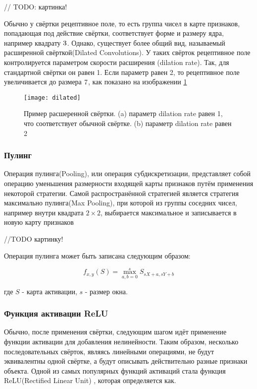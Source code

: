 // TODO: картинка!

Обычно у свёртки рецептивное поле, то есть группа чисел в карте признаков, попадающая под действие свёртки,
соответствует форме и размеру ядра, например квадрату $3 \time 3$. Однако, существует более общий вид,
называемый расширенной свёрткой(Dilated Convolutions)\cite{Dilated}. У таких свёрток рецептивное поле контролируется параметром скорости
расширения (dilation rate). Так, для стандартной свёртки он равен 1. Если параметр равен 2, то рецептивное поле увеличивается
до размера $7 \time 7$, как показано на изображении \ref{fig:dilated}

\begin{figure}[h]
    \centering
    \texttt{[image: dilated]}
    \caption{Пример расшеренной свёртки.     (a) параметр dilation rate равен 1, что соответствует обычной свёртке. (b) параметр dilation rate равен 2}
    \label{fig:dilated}
\end{figure}


\subsubsection{Пулинг}

Операция пулинга(Pooling), или операция субдискретизации, представляет собой операцию уменьшения размерности входящей карты признаков 
путём применения некоторой стратегии. Самой распространённой стратегией является стратегия максимально пулинга(Max Pooling),
при которой из группы соседних чисел, например внутри квадрата $2 \times 2$, выбирается максимальное и записывается в новую
карту признаков 

//TODO картинку!

Операция пулинга может быть записана следующим образом:

\begin{equation}
    f_{x,y}(S) = \max_{a,b=0}^{s}S_{sX+a, sY+b}
\end{equation}

где $S$ - карта активации, $s$ - размер окна.

\subsubsection{Функция активации ReLU}

Обычно, после применения свёртки, следующим шагом идёт применение функции активации для добавления нелинейности. Таким образом,
несколько последовательных свёрток, являясь линейными операциями, не будут эквивалентны одной свёртке, а будут описывать действительно 
разные признаки объекта. Одной из самых популярных функций активаций стала функция ReLU(Rectified Linear Unit) \cite{ReLU}, которая определяется
как.

